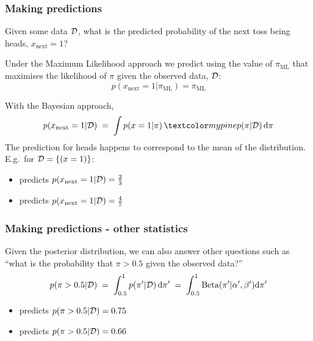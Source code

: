 \begin{frame}
\frametitle{Making predictions}

Given some data $\cal D$, what is the predicted probability of the
next toss being heads, $x_{\mathrm{next}}=1$?

Under the Maximum Likelihood approach we predict using the value of
$\pi_{\mathrm{ML}}$ that maximises the likelihood of $\pi$ given the observed data, ${\cal D}$:
\[
p(x_{\mathrm{next}}=1|\pi_{\mathrm{ML}}) = \pi_{\mathrm{ML}}
\]

With the Bayesian approach, 
%
\[
p(x_{\mathrm{next}}=1|{\cal D})\;=\;\int p(x=1|\pi)\,\PineGreen{p(\pi|{\cal D})}\,{\rm d}\pi
\]
%
The prediction for heads happens to correspond to
the mean of the 
distribution. E.g.\ for  ${\cal D} = \{(x=1)\}$:
\begin{itemize}
\item {} predicts $p(x_{\mathrm{next}}=1|{\cal D}) = \frac{2}{3}$
\item {} predicts
  $p(x_{\mathrm{next}}=1|{\cal D}) = \frac{4}{7}$ 
\end{itemize}
\end{frame}


\begin{frame}
\frametitle{Making predictions - other statistics}

Given the posterior distribution, we can also answer other questions
such as ``what is the probability that $\pi>0.5$ given the observed
data?''
%
\[
p(\pi>0.5|{\cal D}) 
\;=\;\int_{0.5}^1 p(\pi'|{\cal D})\,{\rm d}\pi'
\;=\;\int_{0.5}^1 \mathrm{Beta}(\pi'|\alpha', \beta'){\rm d}\pi'
\]
%

\begin{itemize}
\item {} predicts $p(\pi>0.5|{\cal D}) = 0.75$
\item {} predicts $p(\pi>0.5|{\cal D}) = 0.66$
\end{itemize}


\end{frame}


